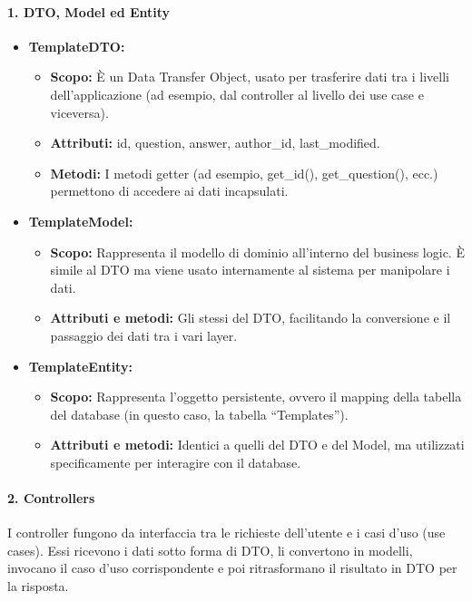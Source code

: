     \paragraph{1. DTO, Model ed Entity}
    \begin{itemize}
        \item \textbf{TemplateDTO:}
        \begin{itemize}
            \item \textbf{Scopo:} È un Data Transfer Object, usato per trasferire dati tra i livelli dell’applicazione (ad esempio, dal controller al livello dei use case e viceversa).
            \item \textbf{Attributi:} id, question, answer, author\_id, last\_modified.
            \item \textbf{Metodi:} I metodi getter (ad esempio, get\_id(), get\_question(), ecc.) permettono di accedere ai dati incapsulati.
        \end{itemize}
        \item \textbf{TemplateModel:}
        \begin{itemize}
            \item \textbf{Scopo:} Rappresenta il modello di dominio all’interno del business logic. È simile al DTO ma viene usato internamente al sistema per manipolare i dati.
            \item \textbf{Attributi e metodi:} Gli stessi del DTO, facilitando la conversione e il passaggio dei dati tra i vari layer.
        \end{itemize}
        \item \textbf{TemplateEntity:}
        \begin{itemize}
            \item \textbf{Scopo:} Rappresenta l’oggetto persistente, ovvero il mapping della tabella del database (in questo caso, la tabella “Templates”).
            \item \textbf{Attributi e metodi:} Identici a quelli del DTO e del Model, ma utilizzati specificamente per interagire con il database.
        \end{itemize}
    \end{itemize}
    
    \paragraph{2. Controllers}
    I controller fungono da interfaccia tra le richieste dell’utente e i casi d’uso (use cases). Essi ricevono i dati sotto forma di DTO, li convertono in modelli, invocano il caso d’uso corrispondente e poi ritrasformano il risultato in DTO per la risposta.
    
